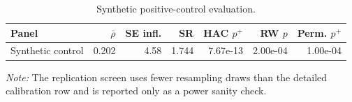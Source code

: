 \begin{table}[H]
\centering
\small
\caption{Synthetic positive-control evaluation.}
\label{tab:synthetic-positive-control}
\begin{tabular}{lrrrrrr}
\toprule
Panel & $\bar\rho$ & SE infl. & SR & HAC $p^+$ & RW $p$ & Perm. $p^+$ \\
\midrule
Synthetic control & 0.202 & 4.58 & 1.744 & 7.67e-13 & 2.00e-04 & 1.00e-04 \\
\bottomrule
\end{tabular}
\end{table}

\begin{table}[H]
\centering
\small
\caption{Positive-control replication screen.}
\label{tab:synthetic-positive-control-replications}
\par\footnotesize\emph{Note:} The replication screen uses fewer resampling draws than the detailed calibration row and is reported only as a power sanity check.
\end{table}
